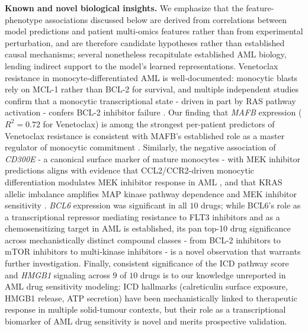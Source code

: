 \documentclass[pdflatex,sn-mathphys-num]{sn-jnl}
\theoremstyle{thmstyleone}
\theoremstyle{thmstyletwo}
\theoremstyle{thmstylethree}
\begin{document}
\noindent\textbf{Known and novel biological insights.} We emphasize that the feature-phenotype associations discussed below are derived from correlations between model predictions and patient multi-omics features rather than from experimental perturbation, and are therefore candidate hypotheses rather than established causal mechanisms; several nonetheless recapitulate established AML biology, lending indirect support to the model's learned representations. Venetoclax resistance in monocyte-differentiated AML is well-documented: monocytic blasts rely on MCL-1 rather than BCL-2 for survival, and multiple independent studies confirm that a monocytic transcriptional state - driven in part by RAS pathway activation - confers BCL-2 inhibitor failure \cite{kennedy2026ras, yashar2026pu1, mohanty2024venetoclax, allen2025venetoclax}. Our finding that \textit{MAFB} expression ($R^2 = 0.72$ for Venetoclax) is among the strongest per-patient predictors of Venetoclax resistance is consistent with MAFB's established role as a master regulator of monocytic commitment \cite{ventura2025mafb, yang2015dnmt3a}. Similarly, the negative association of \textit{CD300E} - a canonical surface marker of mature monocytes \cite{li2023cd300e} - with MEK inhibitor predictions aligns with evidence that CCL2/CCR2-driven monocytic differentiation modulates MEK inhibitor response in AML \cite{modak2024targeting}, and that KRAS allelic imbalance amplifies MAP kinase pathway dependence and MEK inhibitor sensitivity \cite{burgess2017kras, pedicona2022lsd1}. \textit{BCL6} expression was significant in all $10$ drugs; while BCL6's role as a transcriptional repressor mediating resistance to FLT3 inhibitors \cite{zavorka2021bcl6} and as a chemosensitizing target in AML \cite{zhang2023bcl6} is established, its pan top-10 drug significance across mechanistically distinct compound classes - from BCL-2 inhibitors to mTOR inhibitors to multi-kinase inhibitors - is a novel observation that warrants further investigation. Finally, consistent significance of the ICD pathway score and \textit{HMGB1} signaling across $9$ of $10$ drugs is to our knowledge unreported in AML drug sensitivity modeling: ICD hallmarks (calreticulin surface exposure, HMGB1 release, ATP secretion) have been mechanistically linked to therapeutic response in multiple solid-tumour contexts, but their role as a transcriptional biomarker of AML drug sensitivity is novel and merits prospective validation.
\end{document}
